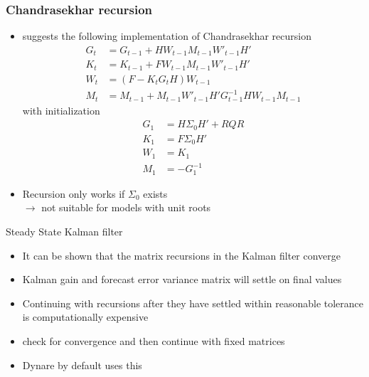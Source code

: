 \documentclass[handout,usepdftitle=false,xcolor=dvipsnames,aspectratio=169]{beamer}
\begin{document}
\begin{frame}
  \frametitle{Chandrasekhar recursion}
  \begin{itemize}
    \item \textcite{Herbst2015} suggests the following implementation of Chandrasekhar recursion
          \begin{align}
            G_t & = G_{t-1} + HW_{t-1}M_{t-1}W'_{t-1}H'                    \\
            K_t & = K_{t-1} + FW_{t-1}M_{t-1}W'_{t-1}H'                    \\
            W_t & = (F - K_tG_tH)W_{t-1}                                   \\
            M_t & = M_{t-1} + M_{t-1}W'_{t-1}H'G^{-1}_{t-1}HW_{t-1}M_{t-1}
          \end{align}
          with initialization
          \begin{align}
            G_1 & = H\Sigma_0H' + RQR \\
            K_1 & = F\Sigma_0H'       \\
            W_1 & = K_1               \\
            M_1 & = -G^{-1}_1
          \end{align}
    \item Recursion only works if $\Sigma_0$ exists\\
          $\rightarrow$ not suitable for models with unit roots
  \end{itemize}
\end{frame}

\begin{frame}{Steady State Kalman filter}
  \begin{itemize}
    \item It can be shown that the matrix recursions in the Kalman filter converge \parencite[See][Chapter 13.5]{Hamilton1994}\vspace{0.2cm}
    \item Kalman gain and forecast error variance matrix will settle on final values \vspace{0.2cm}
    \item Continuing with recursions after they have settled within reasonable tolerance is computationally expensive\vspace{0.2cm}
    \item[$\rightarrow$] check for convergence and then continue with fixed matrices\vspace{0.2cm}
    \item Dynare by default uses this 
  \end{itemize}
\end{frame}
\end{document}
